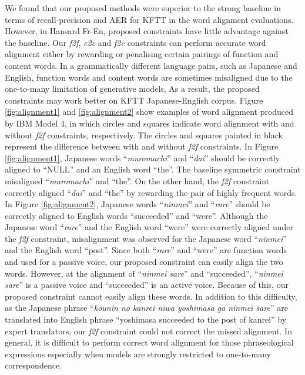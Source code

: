 \documentclass[english]{jnlp_1.4}
\begin{document}
We found that our proposed methods were superior to the strong baseline in terms of recall-precision and AER for KFTT in the word alignment evaluations.
However, in Hansard Fr-En, proposed constraints have little advantage against the baseline.
Our \textit{f2f}, \textit{c2c}  and \textit{f2c} constraints can perform accurate word alignment either by rewarding or penalising certain pairings of function and content words.
In a grammatically different language pairs, such as Japanese and English, function words and content words are sometimes misaligned due to the one-to-many limitation of generative models, As a result, the proposed constraints may work better on KFTT Japanese-English corpus.
Figure \ref{fig:alignment1} and \ref{fig:alignment2} show examples of word alignment produced by IBM Model 4, in which circles and squares indicate word alignment with and without \textit{f2f} constraints, respectively.
The circles and squares painted in black represent the difference between with and without \textit{f2f}  constraints.
In Figure \ref{fig:alignment1}, Japanese words ``\textit{muromachi}'' and ``\textit{dai}'' should be correctly aligned to ``NULL'' and an English word ``the''.
The baseline symmetric constraint misaligned ``\textit{muromachi}'' and ``the''.
On the other hand, the \textit{f2f}  constraint correctly aligned ``\textit{dai}'' and ``the'' by rewarding the pair of highly frequent words.
In Figure \ref{fig:alignment2}, Japanese words ``\textit{ninmei}'' and ``\textit{rare}'' should be correctly aligned to English words ``succeeded'' and ``were''.
Although the Japanese word ``\textit{rare}'' and the English word ``were'' were correctly aligned under the \textit{f2f}  constraint, misalignment was observed for the Japanese word ``\textit{ninmei}'' and the English word ``post''.
Since both ``\textit{rare}'' and ``were'' are function words and used for a passive voice, our proposed constraint can easily align the two words.
However, at the alignment of ``\textit{ninmei sare}'' and ``succeeded'', ``\textit{ninmei sare}'' is a passive voice and ``succeeded'' is an active voice.
Because of this, our proposed constraint cannot easily align these words.
In addition to this difficulty, as the Japanese phrase ``\textit{kounin no kanrei niwa yoshimasa ga ninmei sare}'' are translated into English phrase ``yoshimasa succeeded to the post of kanrei'' by expert translators, our \textit{f2f}  constraint could not correct the missed alignment.
In general, it is difficult to perform correct word alignment for those phraseological expressions especially when models are strongly restricted to one-to-many correspondence.
\end{document}
